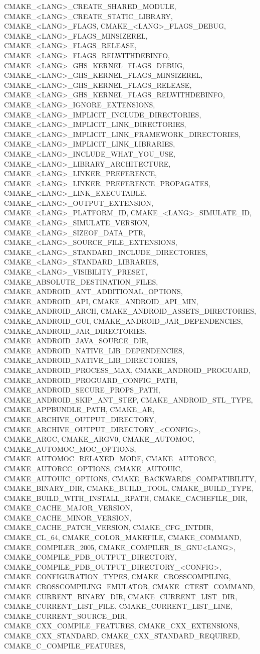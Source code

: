 {{CMAKE_<LANG>_CREATE_SHARED_MODULE,
CMAKE_<LANG>_CREATE_STATIC_LIBRARY,
CMAKE_<LANG>_FLAGS,
CMAKE_<LANG>_FLAGS_DEBUG,
CMAKE_<LANG>_FLAGS_MINSIZEREL,
CMAKE_<LANG>_FLAGS_RELEASE,
CMAKE_<LANG>_FLAGS_RELWITHDEBINFO,
CMAKE_<LANG>_GHS_KERNEL_FLAGS_DEBUG,
CMAKE_<LANG>_GHS_KERNEL_FLAGS_MINSIZEREL,
CMAKE_<LANG>_GHS_KERNEL_FLAGS_RELEASE,
CMAKE_<LANG>_GHS_KERNEL_FLAGS_RELWITHDEBINFO,
CMAKE_<LANG>_IGNORE_EXTENSIONS,
CMAKE_<LANG>_IMPLICIT_INCLUDE_DIRECTORIES,
CMAKE_<LANG>_IMPLICIT_LINK_DIRECTORIES,
CMAKE_<LANG>_IMPLICIT_LINK_FRAMEWORK_DIRECTORIES,
CMAKE_<LANG>_IMPLICIT_LINK_LIBRARIES,
CMAKE_<LANG>_INCLUDE_WHAT_YOU_USE,
CMAKE_<LANG>_LIBRARY_ARCHITECTURE,
CMAKE_<LANG>_LINKER_PREFERENCE,
CMAKE_<LANG>_LINKER_PREFERENCE_PROPAGATES,
CMAKE_<LANG>_LINK_EXECUTABLE,
CMAKE_<LANG>_OUTPUT_EXTENSION,
CMAKE_<LANG>_PLATFORM_ID,
CMAKE_<LANG>_SIMULATE_ID,
CMAKE_<LANG>_SIMULATE_VERSION,
CMAKE_<LANG>_SIZEOF_DATA_PTR,
CMAKE_<LANG>_SOURCE_FILE_EXTENSIONS,
CMAKE_<LANG>_STANDARD_INCLUDE_DIRECTORIES,
CMAKE_<LANG>_STANDARD_LIBRARIES,
CMAKE_<LANG>_VISIBILITY_PRESET,
CMAKE_ABSOLUTE_DESTINATION_FILES,
CMAKE_ANDROID_ANT_ADDITIONAL_OPTIONS,
CMAKE_ANDROID_API,
CMAKE_ANDROID_API_MIN,
CMAKE_ANDROID_ARCH,
CMAKE_ANDROID_ASSETS_DIRECTORIES,
CMAKE_ANDROID_GUI,
CMAKE_ANDROID_JAR_DEPENDENCIES,
CMAKE_ANDROID_JAR_DIRECTORIES,
CMAKE_ANDROID_JAVA_SOURCE_DIR,
CMAKE_ANDROID_NATIVE_LIB_DEPENDENCIES,
CMAKE_ANDROID_NATIVE_LIB_DIRECTORIES,
CMAKE_ANDROID_PROCESS_MAX,
CMAKE_ANDROID_PROGUARD,
CMAKE_ANDROID_PROGUARD_CONFIG_PATH,
CMAKE_ANDROID_SECURE_PROPS_PATH,
CMAKE_ANDROID_SKIP_ANT_STEP,
CMAKE_ANDROID_STL_TYPE,
CMAKE_APPBUNDLE_PATH,
CMAKE_AR,
CMAKE_ARCHIVE_OUTPUT_DIRECTORY,
CMAKE_ARCHIVE_OUTPUT_DIRECTORY_<CONFIG>,
CMAKE_ARGC,
CMAKE_ARGV0,
CMAKE_AUTOMOC,
CMAKE_AUTOMOC_MOC_OPTIONS,
CMAKE_AUTOMOC_RELAXED_MODE,
CMAKE_AUTORCC,
CMAKE_AUTORCC_OPTIONS,
CMAKE_AUTOUIC,
CMAKE_AUTOUIC_OPTIONS,
CMAKE_BACKWARDS_COMPATIBILITY,
CMAKE_BINARY_DIR,
CMAKE_BUILD_TOOL,
CMAKE_BUILD_TYPE,
CMAKE_BUILD_WITH_INSTALL_RPATH,
CMAKE_CACHEFILE_DIR,
CMAKE_CACHE_MAJOR_VERSION,
CMAKE_CACHE_MINOR_VERSION,
CMAKE_CACHE_PATCH_VERSION,
CMAKE_CFG_INTDIR,
CMAKE_CL_64,
CMAKE_COLOR_MAKEFILE,
CMAKE_COMMAND,
CMAKE_COMPILER_2005,
CMAKE_COMPILER_IS_GNU<LANG>,
CMAKE_COMPILE_PDB_OUTPUT_DIRECTORY,
CMAKE_COMPILE_PDB_OUTPUT_DIRECTORY_<CONFIG>,
CMAKE_CONFIGURATION_TYPES,
CMAKE_CROSSCOMPILING,
CMAKE_CROSSCOMPILING_EMULATOR,
CMAKE_CTEST_COMMAND,
CMAKE_CURRENT_BINARY_DIR,
CMAKE_CURRENT_LIST_DIR,
CMAKE_CURRENT_LIST_FILE,
CMAKE_CURRENT_LIST_LINE,
CMAKE_CURRENT_SOURCE_DIR,
CMAKE_CXX_COMPILE_FEATURES,
CMAKE_CXX_EXTENSIONS,
CMAKE_CXX_STANDARD,
CMAKE_CXX_STANDARD_REQUIRED,
CMAKE_C_COMPILE_FEATURES,
}}

